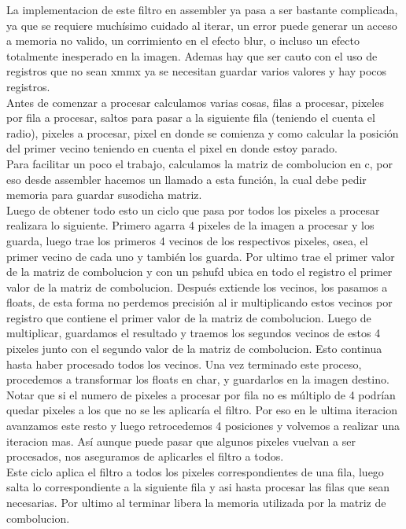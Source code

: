 La implementacion de este filtro en assembler ya pasa a ser bastante complicada, ya que se requiere muchísimo cuidado al iterar, un error puede generar un acceso a memoria no valido, un corrimiento en el efecto blur, o incluso un efecto totalmente inesperado en la imagen. Ademas hay que ser cauto con el uso de registros que no sean xmmx ya se necesitan guardar varios valores y hay pocos registros. \\
Antes de comenzar a procesar calculamos varias cosas, filas a procesar, pixeles por fila a procesar, saltos para pasar a la siguiente fila (teniendo el cuenta el radio), pixeles a procesar, pixel en donde se comienza y como calcular la posición del primer vecino teniendo en cuenta el pixel en donde estoy parado. \\
Para facilitar un poco el trabajo, calculamos la matriz de combolucion en c, por eso desde assembler hacemos un llamado a esta función, la cual debe pedir memoria para guardar susodicha matriz. \\
Luego de obtener todo esto un ciclo que pasa por todos los pixeles a procesar realizara lo siguiente. Primero agarra 4 pixeles de la imagen a procesar y los guarda, luego trae los primeros 4 vecinos de los respectivos pixeles, osea, el primer vecino de cada uno y también los guarda. Por ultimo trae el primer valor de la matriz de combolucion y con un pshufd ubica en todo el registro el primer valor de la matriz de combolucion. Después extiende los vecinos, los pasamos a floats, de esta forma no perdemos precisión al ir multiplicando estos vecinos por registro que contiene el primer valor de la matriz de combolucion. Luego de multiplicar, guardamos el resultado y traemos los segundos vecinos de estos 4 pixeles junto con el segundo valor de la matriz de combolucion. Esto continua hasta haber procesado todos los vecinos. Una vez terminado este proceso, procedemos a transformar los floats en char, y guardarlos en la imagen destino. Notar que si el numero de pixeles a procesar por fila no es múltiplo de 4 podrían quedar pixeles a los que no se les aplicaría el filtro. Por eso en le ultima iteracion avanzamos este resto y luego retrocedemos 4 posiciones y volvemos a realizar una iteracion mas. Así aunque puede pasar que algunos pixeles vuelvan a ser procesados, nos aseguramos de aplicarles el filtro a todos. \\
Este ciclo aplica el filtro a todos los pixeles correspondientes de una fila, luego salta lo correspondiente a la siguiente fila y asi hasta procesar las filas que sean necesarias. Por ultimo al terminar libera la memoria utilizada por la matriz de combolucion. \\

